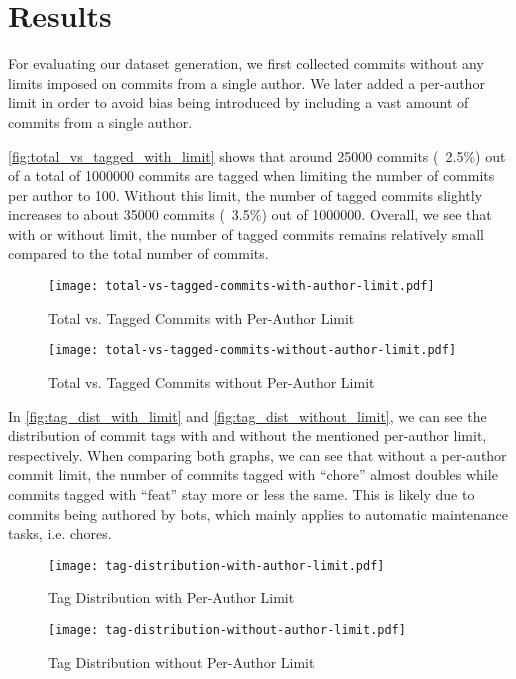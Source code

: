 \section{Results}
\label{sec:results}

For evaluating our dataset generation, we first collected commits without any limits imposed on commits from a single author. We later added a per-author limit in order to avoid bias being introduced by including a vast amount of commits from a single author.

\autoref{fig:total_vs_tagged_with_limit} shows that around 25000 commits (~2.5\%) out of a total of 1000000 commits are tagged when limiting the number of commits per author to 100. Without this limit, the number of tagged commits slightly increases to about 35000 commits (~3.5\%) out of 1000000. Overall, we see that with or without limit, the number of tagged commits remains relatively small compared to the total number of commits.

\begin{figure}[H]
  \centering
  \texttt{[image: total-vs-tagged-commits-with-author-limit.pdf]}
  \caption{Total vs. Tagged Commits with Per-Author Limit}
  \label{fig:total_vs_tagged_with_limit}
\end{figure}

\begin{figure}[H]
  \centering
  \texttt{[image: total-vs-tagged-commits-without-author-limit.pdf]}
  \caption{Total vs. Tagged Commits without Per-Author Limit}
  \label{fig:total_vs_tagged_without_limit}
\end{figure}

In \autoref{fig:tag_dist_with_limit} and \autoref{fig:tag_dist_without_limit}, we can see the distribution of commit tags with and without the mentioned per-author limit, respectively. When comparing both graphs, we can see that without a per-author commit limit, the number of commits tagged with “chore” almost doubles while commits tagged with “feat” stay more or less the same. This is likely due to commits being authored by bots, which mainly applies to automatic maintenance tasks, i.e. chores.

\begin{figure}[H]
  \centering
  \texttt{[image: tag-distribution-with-author-limit.pdf]}
  \caption{Tag Distribution with Per-Author Limit}
  \label{fig:tag_dist_with_limit}
\end{figure}

\begin{figure}[H]
  \centering
  \texttt{[image: tag-distribution-without-author-limit.pdf]}
  \caption{Tag Distribution without Per-Author Limit}
  \label{fig:tag_dist_without_limit}
\end{figure}

